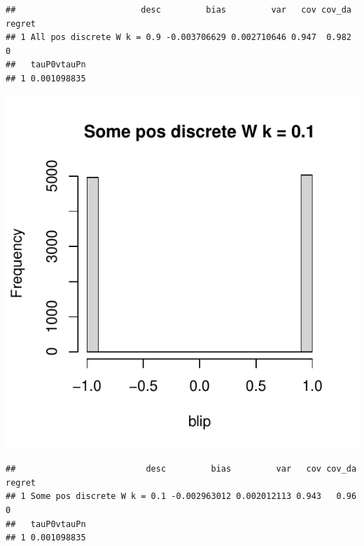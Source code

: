 \documentclass[11pt]{article}\usepackage[]{graphicx}\usepackage[table]{xcolor}
\makeatletter
\def\maxwidth{ %
  \ifdim\Gin@nat@width>\linewidth
    \linewidth
  \else
    \Gin@nat@width
  \fi
}
\newenvironment{kframe}{%
 \def\at@end@of@kframe{}%
 \ifinner\ifhmode%
  \def\at@end@of@kframe{\end{minipage}}%
  \begin{minipage}{\columnwidth}%
 \fi\fi%
 \def\FrameCommand##1{\hskip\@totalleftmargin \hskip-\fboxsep
 \colorbox{shadecolor}{##1}\hskip-\fboxsep
     \hskip-\linewidth \hskip-\@totalleftmargin \hskip\columnwidth}%
 \MakeFramed {\advance\hsize-\width
   \@totalleftmargin\z@ \linewidth\hsize
   \@setminipage}}%
 {\par\unskip\endMakeFramed%
 \at@end@of@kframe}
\newenvironment{knitrout}{}{} %
\makeatother
\begin{document}
\begin{knitrout}
\begin{kframe}\begin{verbatim}
##                         desc         bias         var   cov cov_da regret
## 1 All pos discrete W k = 0.9 -0.003706629 0.002710646 0.947  0.982      0
##   tauP0vtauPn
## 1 0.001098835
\end{verbatim}
\end{kframe}
\includegraphics[width=\maxwidth]{figure/unnamed-chunk-4-3} 
\begin{kframe}\begin{verbatim}
##                          desc         bias         var   cov cov_da regret
## 1 Some pos discrete W k = 0.1 -0.002963012 0.002012113 0.943   0.96      0
##   tauP0vtauPn
## 1 0.001098835
\end{verbatim}
\end{kframe}

\end{knitrout}
\end{document}
